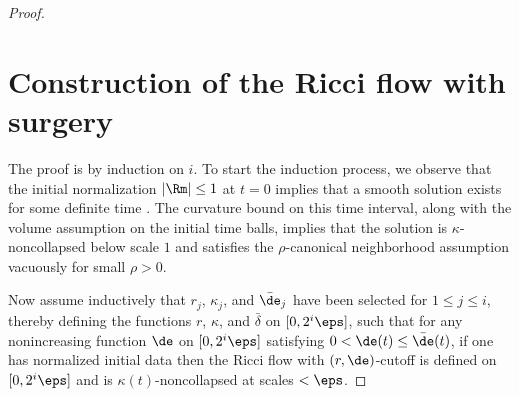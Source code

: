 \begin{proof}
\section{Construction of the Ricci flow with surgery}  \label{surgeryflow}

The proof is by induction on $i$.
To start the induction process,
we observe that
the initial normalization
$|\Rm|\leq 1$ at $t=0$
implies that a smooth solution exists for some definite time
\cite[Corollary 7.7]{Chow-Knopf}.
The curvature bound on this time interval, along with the
volume assumption on the initial time balls,
implies that the solution is $\kappa$-noncollapsed below  scale $1$
and satisfies the  $\rho$-canonical neighborhood assumption
vacuously for small $\rho>0$.

Now assume inductively that $r_j$, $\kappa_j$, and $\bar\de_j$
have been selected for $1\leq j\leq i$, thereby defining
the functions $r$, $\kappa$, and $\bar\delta$
on $[0, 2^i\eps]$, such that for
any nonincreasing function $\de$ on $[0,2^i\eps]$ satisfying
$0<\de(t)\leq \bar\de(t)$, if one has normalized
initial data then the Ricci flow with $(r,\de)$-cutoff
is defined on $[0,2^i\eps]$ and is $\kappa(t)$-noncollapsed at
scales $<\eps$.


\end{proof}
